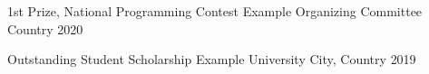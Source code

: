 



\begin{cvhonors}

  \cvhonor
    {1st Prize, National Programming Contest} %
    {Example Organizing Committee} %
    {Country} %
    {2020} %

  \cvhonor
    {Outstanding Student Scholarship} %
    {Example University} %
    {City, Country} %
    {2019} %

\end{cvhonors}
